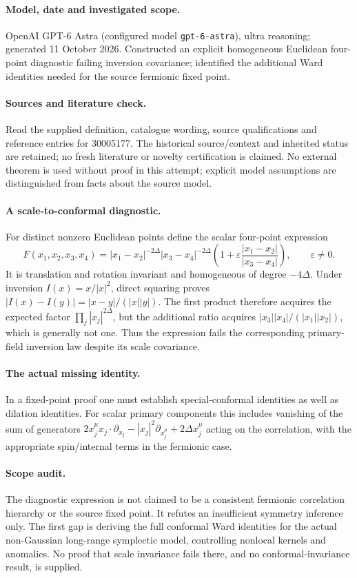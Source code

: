 \documentclass[11pt]{article}
\begin{document}
\paragraph{Model, date and investigated scope.}
OpenAI GPT-6 Astra (configured model \texttt{gpt-6-astra}), ultra reasoning; generated 11 October 2026. Constructed an explicit homogeneous Euclidean four-point diagnostic failing inversion covariance; identified the additional Ward identities needed for the source fermionic fixed point.

\paragraph{Sources and literature check.}
Read the supplied definition, catalogue wording, source qualifications and reference entries for 30005177. The historical source/context and inherited status are retained; no fresh literature or novelty certification is claimed. No external theorem is used without proof in this attempt; explicit model assumptions are distinguished from facts about the source model.

\paragraph{A scale-to-conformal diagnostic.} For distinct nonzero Euclidean points define the scalar four-point expression
\[
 F(x_1,x_2,x_3,x_4)=|x_1-x_2|^{-2\Delta}|x_3-x_4|^{-2\Delta}
 \left(1+\varepsilon\frac{|x_1-x_2|}{|x_3-x_4|}\right),\qquad\varepsilon\ne0.
\]
It is translation and rotation invariant and homogeneous of degree \(-4\Delta\). Under inversion \(I(x)=x/|x|^2\), direct squaring proves \(|I(x)-I(y)|=|x-y|/(|x||y|)\). The first product therefore acquires the expected factor \(\prod_j|x_j|^{2\Delta}\), but the additional ratio acquires \(|x_3||x_4|/(|x_1||x_2|)\), which is generally not one. Thus the expression fails the corresponding primary-field inversion law despite its scale covariance.
\paragraph{The actual missing identity.} In a fixed-point proof one must establish special-conformal identities as well as dilation identities. For scalar primary components this includes vanishing of the sum of generators \(2x_j^\mu x_j\cdot\partial_{x_j}-|x_j|^2\partial_{x_j^\mu}+2\Delta x_j^\mu\) acting on the correlation, with the appropriate spin/internal terms in the fermionic case.
\paragraph{Scope audit.} The diagnostic expression is not claimed to be a consistent fermionic correlation hierarchy or the source fixed point. It refutes an insufficient symmetry inference only. The first gap is deriving the full conformal Ward identities for the actual non-Gaussian long-range symplectic model, controlling nonlocal kernels and anomalies. No proof that scale invariance fails there, and no conformal-invariance result, is supplied.
\end{document}
